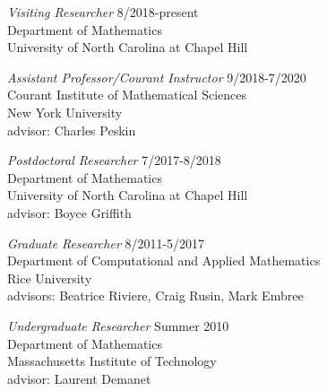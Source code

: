 \documentclass{article} %
\begin{document}
\vspace{0.1cm}
\indent
{\em Visiting Researcher} \hspace*{\fill} 8/2018-present  \\
\indent
Department of Mathematics \\
\indent University of North Carolina at Chapel Hill

\vspace{0.1cm}
\indent
{\em Assistant Professor/Courant Instructor} \hspace*{\fill} 9/2018-7/2020 \\ 
\indent Courant Institute of Mathematical Sciences \\
\indent New York University \\
\indent
advisor: Charles Peskin 

\vspace{0.1cm}
\indent
{\em Postdoctoral Researcher} \hspace*{\fill} 7/2017-8/2018 \\
\indent Department of Mathematics \\
\indent University of North Carolina at Chapel Hill \\
\indent
advisor: Boyce Griffith 

\vspace{0.1cm}
\indent 
{\em Graduate Researcher}
 \hspace*{\fill} 8/2011-5/2017 \\
\indent Department of Computational and Applied Mathematics \\ 
\indent Rice University \\
\indent 
advisors: Beatrice Riviere, Craig Rusin, Mark Embree 

\vspace{0.1cm}
\indent
{\em Undergraduate Researcher} \hspace*{\fill} Summer 2010 \\
\indent Department of Mathematics \\
\indent Massachusetts Institute of Technology  \\
\indent
advisor: Laurent Demanet 
\end{document}
